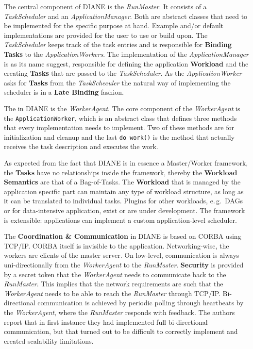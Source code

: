 \documentclass{sig-alternate}
\begin{document}
The central component of DIANE is the \textit{RunMaster}.
It consists of a \textit{TaskScheduler} and an \textit{ApplicationManager}.
Both are abstract classes that need to be implemented for the specific purpose
at hand. Example and/or default implementations are provided for the user to
use or build upon.
The \textit{TaskScheduler} keeps track of the task entries and is responsible
for \textbf{Binding Tasks} to the \textit{ApplicationWorkers}.
The implementation of the \textit{ApplicationManager} is as its name suggest,
responsible for defining the application \textbf{Workload} and the creating
\textbf{Tasks} that are passed to the \textit{TaskScheduler}.
As the \textit{ApplicationWorker} asks for \textbf{Tasks} from the
\textit{TaskScheculer} the natural way of implementing the scheduler is in a
\textbf{Late Binding} fashion.

The \pilot in DIANE is the \textit{WorkerAgent}.
The core component of the \textit{WorkerAgent} is the
\texttt{ApplicationWorker}, which is an abstract class that defines three
methods that every implementation needs to implement.
Two of these methods are for initialization and cleanup and the last
\texttt{do\_work()} is the method that actually receives the task description
and executes the work.

As expected from the fact that DIANE is in essence a Master/Worker framework,
the \textbf{Tasks} have no relationships inside the framework, thereby
the \textbf{Workload Semantics} are that of a Bag-of-Tasks.
The \textbf{Workload} that is managed by the application specific part can
maintain any type of workload structure, as long as it can be translated to
individual tasks\cite{diane-dag, diane-etc}.
Plugins for other workloads, e.\,g.\ DAGs or for data-intensive
application, exist or are under development. The framework is extensible:
applications can implement a custom application-level scheduler.

The \textbf{Coordination \& Communication} in DIANE is based on CORBA using
TCP/IP.
CORBA itself is invisible to the application.
Networking-wise, the workers are clients of the master server.
On low-level, communication is always uni-directionally from the
\textit{WorkerAgent} to the \textit{RunMaster}.
\textbf{Security} is provided by a secret token that the \textit{WorkerAgent}
needs to communicate back to the \textit{RunMaster}.
This implies that the network requirements are such that the
\textit{WorkerAgent} needs to be able to reach the \textit{RunMaster} through
TCP/IP.
Bi-directional communication is achieved by periodic polling through
heartbeats by the \textit{WorkerAgent}, where the \textit{RunMaster} responds
with feedback.
The authors report that in first instance they had implemented full
bi-directional communication, but that turned out to be difficult to correctly
implement and created scalability limitations.
\end{document}
